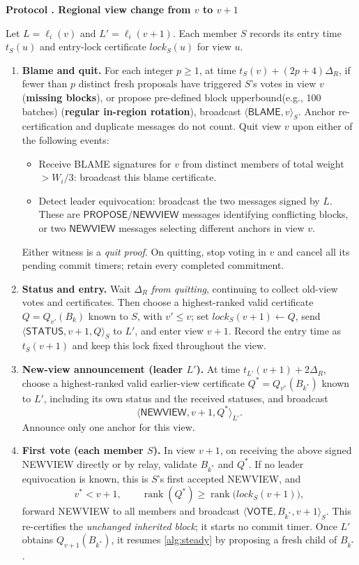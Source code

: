\documentclass[11pt,a4paper,onecolumn]{article}
\newcommand{\rank}{\operatorname{rank}}
\newcommand{\Tag}[1]{\ensuremath{\mathsf{#1}}}
\newcounter{protocol}
\newenvironment{protocol}[2]{\refstepcounter{protocol}\label{#1}
\begin{mdframed}[nobreak=true,linewidth=.6pt,skipabove=9pt,skipbelow=9pt,
innertopmargin=7pt,innerbottommargin=7pt]\small
\noindent\textbf{Protocol \theprotocol. #2}\par\smallskip}{\end{mdframed}}
\begin{document}
\begin{protocol}{alg:change}{Regional view change from $v$ to $v+1$}
Let $L=\ell_i(v)$ and $L'=\ell_i(v+1)$. Each member $S$ records its entry
time $t_S(u)$ and entry-lock certificate $\mathit{lock}_S(u)$ for view $u$.
\begin{enumerate}[label=\textbf{V\arabic*.},itemsep=4pt]
\item \textbf{Blame and quit.} For each integer $p\geq1$, at time
$t_S(v)+(2p+4)\Delta_R$, if fewer than $p$ distinct fresh proposals have
triggered $S$'s votes in view $v$ (\textbf{missing blocks}), or propose pre-defined block upperbound(e.g., 100 batches) (\textbf{regular in-region rotation}), broadcast $\langle\Tag{BLAME},v\rangle_S$.
Anchor re-certification and duplicate messages do not count.
Quit view $v$ upon either of the following events:
\begin{itemize}
\item Receive BLAME signatures for $v$ from distinct members of total
weight $>W_i/3$: broadcast this blame certificate.
\item Detect leader equivocation: broadcast the two messages signed by $L$.
These are \Tag{PROPOSE}/\Tag{NEWVIEW} messages identifying conflicting blocks,
or two \Tag{NEWVIEW} messages selecting different anchors in view $v$.
\end{itemize}
Either witness is a \emph{quit proof}. On quitting, stop voting in $v$ and
cancel all its pending commit timers; retain every completed commitment.

\item \textbf{Status and entry.} Wait $\Delta_R$ \emph{from quitting},
continuing to collect old-view votes and certificates. Then choose a
highest-ranked valid certificate $Q=Q_{v'}(B_k)$ known to $S$, with $v'\leq v$;
set $\mathit{lock}_S(v+1)\gets Q$, send
$\langle\Tag{STATUS},v+1,Q\rangle_S$ to $L'$, and enter view $v+1$.
Record the entry time as $t_S(v+1)$ and keep this lock fixed throughout the view.

\item \textbf{New-view announcement (leader $L'$).} At time
$t_{L'}(v+1)+2\Delta_R$, choose a highest-ranked valid earlier-view
certificate $Q^*=Q_{v^*}(B_{k^*})$ known to $L'$, including its own status
and the received statuses, and broadcast
\[
 \langle\Tag{NEWVIEW},v+1,Q^*\rangle_{L'}.
\]
Announce only one anchor for this view.

\item \textbf{First vote (each member $S$).} In view $v+1$, on receiving
the above signed NEWVIEW directly or by relay, validate $B_{k^*}$ and $Q^*$.
If no leader equivocation is known, this is $S$'s first accepted NEWVIEW,
and
\[
 v^*<v+1,
 \qquad \rank(Q^*)\geq\rank\bigl(\mathit{lock}_S(v+1)\bigr),
\]
forward NEWVIEW to all members and broadcast
$\langle\Tag{VOTE},B_{k^*},v+1\rangle_S$.
This re-certifies the \emph{unchanged inherited block}; it starts no commit
timer. Once $L'$ obtains $Q_{v+1}(B_{k^*})$, it resumes
\cref{alg:steady} by proposing a fresh child of $B_{k^*}$.
\end{enumerate}
\end{protocol}
\end{document}
